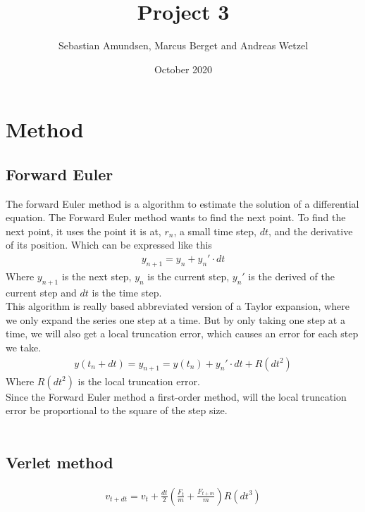 \documentclass[norsk,a4paper,12pt]{article}
\title{Project 3}
\author{Sebastian Amundsen, Marcus Berget and Andreas Wetzel}
\date{October 2020}
\begin{document}
\maketitle

\section{Method}
\subsection{Forward Euler}
The forward Euler method is a algorithm to estimate the solution of a differential equation. The Forward Euler method wants to find the next point. To find the next point, it uses the point it is at, $r_n$, a small time step, $dt$, and the derivative of its position. Which can be expressed like this
\begin{align}
    y_{n+1}=y_n + y_n'\cdot dt
\end{align}
Where $y_{n+1}$ is the next step, $y_n$ is the current step, $y_n'$ is the derived of the current step and $dt$ is the time step.\\
This algorithm is really based abbreviated version of a Taylor expansion, where we only expand the series one step at a time. But by only taking one step at a time, we will also get a local truncation error, which causes an error for each step we take. \begin{align}
    y(t_n+dt)=y_{n+1}=y(t_n)+y_n'\cdot dt + R(dt^2)
\end{align} 
Where $R(dt^2)$ is the local truncation error. \\
Since the Forward Euler method a first-order method, will the local truncation error be proportional to the square of the step size. 
\\
\\
\subsection{Verlet method}
\begin{align}
    v_{t+dt}=v_t +\frac{dt}{2}(\frac{F_t}{m}+\frac{F_{t+m}}{m}) R(dt^3)
\end{align}
\end{document}
